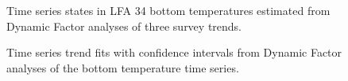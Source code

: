 \documentclass[11pt]{article}
\newcommand{\e}{/SpinDr/backup/bio_data/bio.lobster/figures/LFA3438Framework2019/} %
\begin{document}
   \begin{figure}
    \centering
        \caption{Time series states in LFA 34 bottom temperatures estimated from Dynamic Factor analyses of three survey trends.}

    \end{figure}

\begin{figure}
    \centering
        \caption{Time series trend fits with confidence intervals from Dynamic Factor analyses of the bottom temperature time series.}

    \end{figure}
\end{document}

